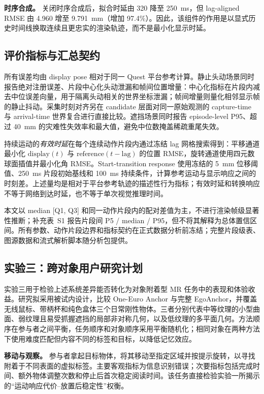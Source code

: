 \documentclass[9pt,twocolumn,letterpaper]{extarticle}
\begin{document}
\textbf{时序合成。}
关闭时序合成后，拟合时延由 320 降至 250~ms，但 lag-aligned RMSE 由 4.960 增至 9.791~mm（增加 97.4\%）。因此，该组件的作用是以显式历史时间线换取连续且更忠实的渲染轨迹，而不是最小化显示时延。
\FloatBarrier

\subsection{评价指标与汇总契约}

所有误差均由 display pose 相对于同一 Quest 平台参考计算。静止头动场景同时报告绝对注册误差、片段中心化头动泄漏和帧间位置增量：中心化指标在片段内减去中位误差向量，用于隔离头动相关的世界坐标泄漏；帧间增量则量化相邻显示帧的静止抖动。采集时刻对齐另在 candidate 层面对同一原始观测的 capture-time 与 arrival-time 世界复合进行直接比较。遮挡场景同时报告 episode-level P95、超过 40~mm 的灾难性失效率和最大值，避免中位数掩盖稀疏重尾失效。

持续运动的\emph{有效时延}在每个连续动作片段内通过冻结 lag 网格搜索得到：平移通道最小化 $\mathrm{display}(t)$ 与 $\mathrm{reference}(t-\mathrm{lag})$ 的位置 RMSE，旋转通道使用四元数球面插值并最小化角 RMSE。Start-transition response 使用冻结的 5~mm 位移阈值、250~ms 片段初始基线和 100~ms 持续条件，计算参考运动与显示响应之间的时刻差。上述量均是相对于平台参考轨迹的描述性行为指标；有效时延和转换响应不等于网络到达时延，也不等于单次视觉推理时间。

本文以 median [Q1, Q3] 和同一动作片段内的配对差值为主，不进行渲染帧级显著性推断；补充表~S1 报告片段间 P5 / median / P95，但不将其解释为总体置信区间。所有参数、动作片段边界和指标契约在正式数据分析前冻结；完整片段级表、图源数据和流式解析脚本随分析包提供。

\subsection{实验三：跨对象用户研究计划}

实验三用于检验上述系统差异能否转化为对象附着型 MR 任务中的表现和体验收益。研究拟采用被试内设计，比较 One-Euro Anchor 与完整 EgoAnchor，并覆盖无线鼠标、带柄杯和纯色盒体三个日常刚性物体。三者分别代表中等纹理的小型曲面、弱纹理且易受抓握遮挡的局部非对称几何，以及低纹理的多平面几何。方法顺序在参与者之间平衡，任务顺序和对象顺序采用平衡随机化；相同对象在两种方法下使用难度匹配但内容不同的标签和目标，以降低记忆效应。

\textbf{移动与观察。} 参与者拿起目标物体，将其移动至指定区域并按提示旋转，以寻找附着于不同表面的虚拟标签。主要客观指标为信息识别错误；次要指标包括完成时间、额外物体调整次数和停止后首次稳定阅读时间。该任务直接检验实验一所揭示的“运动响应代价--放置后稳定性”权衡。
\end{document}
